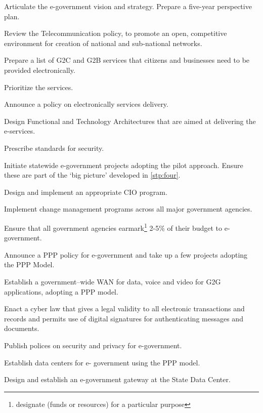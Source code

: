 \begin{steps}
	\item Articulate the e-government vision and strategy. Prepare a five-year perspective plan.

	\item Review the Telecommunication policy, to promote an open, competitive environment for creation of national and sub-national networks.

	\item Prepare a list of G2C and G2B services that citizens and businesses need to be provided electronically.

	Prioritize the services.

	Announce a policy on electronically services delivery.

	\item {\label{stp:four}}Design Functional and Technology Architectures that are aimed at delivering the e-services.

	Prescribe standards for security.

	\item Initiate statewide e-government projects adopting the pilot approach. Ensure these are part of the ‘big picture’ developed in {\ref{stp:four}}.

	\item Design and implement an appropriate CIO program.

	Implement change management programs across all major government agencies.

	\item Ensure that all government agencies earmark\footnote{designate (funds or resources) for a particular purpose} 2-5\% of their budget to e-government.

	Announce a PPP policy for e-government and take up a few projects adopting the PPP
	Model.

	\item Establish a government–wide WAN for data, voice and video for G2G applications, adopting a PPP model.

	\item Enact a cyber law that gives a legal validity to all electronic transactions and records and permits use of digital signatures for authenticating messages and documents.

	Publish polices on security and privacy for e-government.

	\item Establish data centers for e- government using the PPP model.

	Design and establish an e-government gateway at the State Data Center.
\end{steps}

